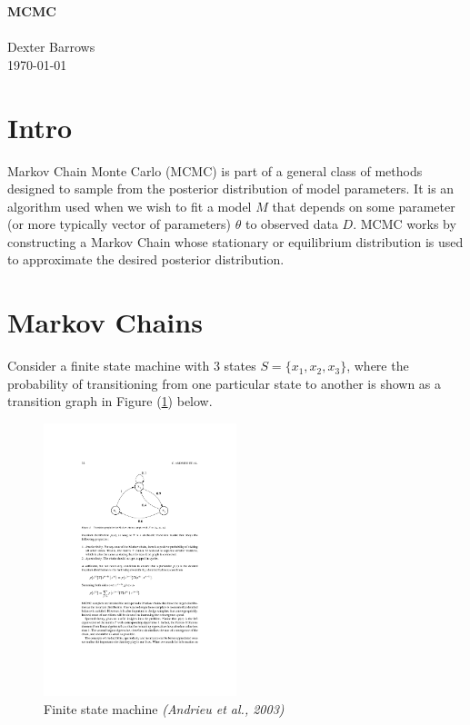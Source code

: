 \documentclass[12pt]{article}
\begin{document}
\noindent
{\LARGE {\bf MCMC} }
\\\\
Dexter Barrows\\
\today

\section{Intro}

    Markov Chain Monte Carlo (MCMC) is part of a general class of methods designed to sample from the posterior distribution of model parameters. It is an algorithm used when we wish to fit a model $M$ that depends on some parameter (or more typically vector of parameters) $\theta$ to observed data $D$. MCMC works by constructing a Markov Chain whose stationary or equilibrium distribution is used to approximate the desired posterior distribution.


\section{Markov Chains}

    Consider a finite state machine with 3 states $S = \{x_1, x_2, x_3\}$, where the probability of transitioning from one particular state to another is shown as a transition graph in Figure (\ref{fsm}) below. 

    \begin{figure}[H]
        \centering
        \includegraphics[width=0.5\textwidth]{./images/finitemachine.pdf}
        \caption{Finite state machine \textit{(Andrieu et al., 2003)}}
        \label{fsm}
    \end{figure}
\end{document}
